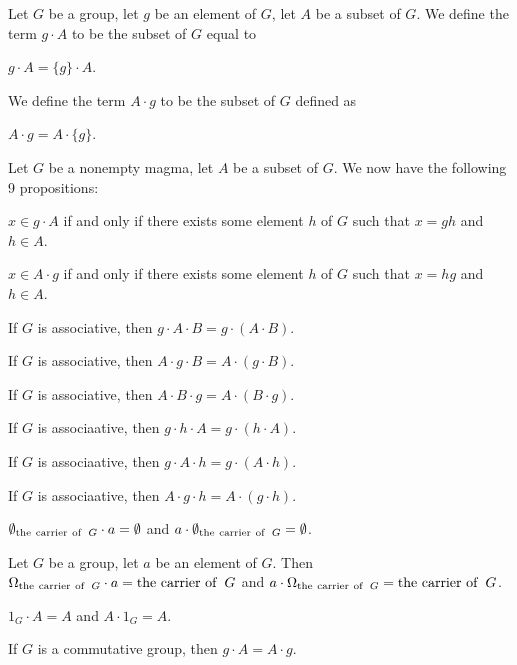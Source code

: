 \documentclass{article}
\begin{document}
\begin{definition}
Let $G$ be a group, let $g$ be an element of $G$, let $A$ be a subset of $G$.
We define the term $g\cdot A$ to be the subset of $G$ equal to
\begin{defn}
\item $g\cdot A=\{g\}\cdot A$.
\end{defn}
We define the term $A\cdot g$ to be the subset of $G$ defined as
\begin{defn}
\item $A\cdot g=A\cdot\{g\}$.
\end{defn}
\end{definition}

Let $G$ be a nonempty magma, let $A$ be a subset of $G$.
We now have the following 9 propositions:
\begin{thm}
\item\label{group2:27} $x\in g\cdot A$ if and only if there exists some
  element $h$ of $G$ such that $x=gh$ and $h\in A$.
\item\label{group2:28} $x\in A\cdot g$ if and only if there exists some
  element $h$ of $G$ such that $x=hg$ and $h\in A$.
\item\label{group2:29} If $G$ is associative, then $g\cdot A\cdot B=g\cdot (A\cdot B)$.
\item\label{group2:30} If $G$ is associative, then $A\cdot g\cdot B=A\cdot(g\cdot B)$.
\item\label{group2:31} If $G$ is associative, then $A\cdot B\cdot g=A\cdot(B\cdot g)$.
\item\label{group2:32} If $G$ is associaative, then $g\cdot h\cdot A=g\cdot(h\cdot A)$.
\item\label{group2:33} If $G$ is associaative, then $g\cdot A\cdot h=g\cdot(A\cdot h)$.
\item\label{group2:34} If $G$ is associaative, then $A\cdot g\cdot h=A\cdot(g\cdot h)$.
\item\label{group2:35} $\emptyset_{\operatorname{the\ carrier\ of\ }G}\cdot a=\emptyset$
  and $a\cdot\emptyset_{\operatorname{the\ carrier\ of\ }G}=\emptyset$.
\item\label{group2:36} Let $G$ be a group, let $a$ be an element of $G$.
  Then $\Omega_{\operatorname{the\ carrier\ of\ }G}\cdot a=\operatorname{the\ carrier\ of\ }G$
  and $a\cdot\Omega_{\operatorname{the\ carrier\ of\ }G}=\operatorname{the\ carrier\ of\ }G$.
\item\label{group2:37} $1_{G}\cdot A=A$ and $A\cdot 1_{G}=A$.
\item\label{group2:38} If $G$ is a commutative group, then $g\cdot A=A\cdot g$.
\end{thm}
\end{document}
